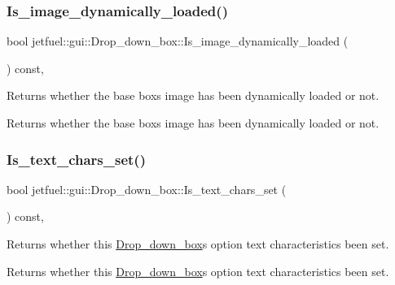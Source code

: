 \subsubsection{\texorpdfstring{Is\+\_\+image\+\_\+dynamically\+\_\+loaded()}{Is\_image\_dynamically\_loaded()}}
{\footnotesize\ttfamily bool jetfuel\+::gui\+::\+Drop\+\_\+down\+\_\+box\+::\+Is\+\_\+image\+\_\+dynamically\+\_\+loaded (\begin{DoxyParamCaption}{ }\end{DoxyParamCaption}) const\hspace{0.3cm}{\ttfamily [inline]}, {\ttfamily [protected]}}



Returns whether the base box\textquotesingle{}s image has been dynamically loaded or not. 

Returns whether the base box\textquotesingle{}s image has been dynamically loaded or not. \mbox{\label{classjetfuel_1_1gui_1_1Drop__down__box_a50162434604bbee6278a00067c1f114b}} 
\subsubsection{\texorpdfstring{Is\+\_\+text\+\_\+chars\+\_\+set()}{Is\_text\_chars\_set()}}
{\footnotesize\ttfamily bool jetfuel\+::gui\+::\+Drop\+\_\+down\+\_\+box\+::\+Is\+\_\+text\+\_\+chars\+\_\+set (\begin{DoxyParamCaption}{ }\end{DoxyParamCaption}) const\hspace{0.3cm}{\ttfamily [inline]}, {\ttfamily [protected]}}



Returns whether this \hyperlink{classjetfuel_1_1gui_1_1Drop__down__box}{Drop\+\_\+down\+\_\+box}\textquotesingle{}s option text characteristics been set. 

Returns whether this \hyperlink{classjetfuel_1_1gui_1_1Drop__down__box}{Drop\+\_\+down\+\_\+box}\textquotesingle{}s option text characteristics been set. \mbox{\label{classjetfuel_1_1gui_1_1Drop__down__box_a9624ef3b9af6d1e3e6fcebb7ef7aa17c}} 
